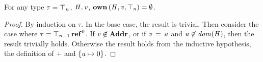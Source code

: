 \begin{lemma}
  \label{lem:top-type-empty-omap}
  For any type $\tau  =  \top_{\mathit{n}}$, $\mathit{H}, \mathit{v}$, $\mathbf{own} \, (  \mathit{H}  ,  \mathit{v}  ,  \top_{\mathit{n}}  )  =   \emptyset $.
\end{lemma}
\begin{proof}
  By induction on $\tau$. In the base case, the result is trivial.
  Then consider the case where $\tau  =   \top_{{\mathit{n}-1}}  \operatorname{\mathbf{ref}}^{ 0 } $. If $ \mathit{v}  \not\in   \textbf{Addr}  $,
  or if $\mathit{v} \, = \, \mathit{a}$ and $ \mathit{a}  \not\in   \mathit{dom}( \mathit{H} )  $, then the result trivially holds.
  Otherwise the result holds from the inductive hypothesis, the definition of $+$ and $\{  \mathit{a}  \mapsto  0  \}$.
\end{proof}

